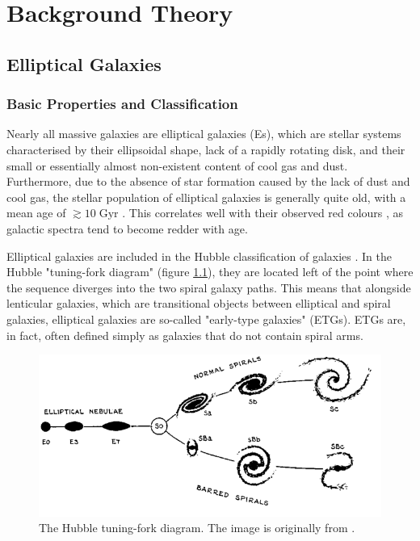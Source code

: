 \documentclass[english, twoside]{HYgradu}
\begin{document}
\chapter{Background Theory} \label{chapter:2}

\section{Elliptical Galaxies} \label{section:elliptical}

\subsection{Basic Properties and Classification}

Nearly all massive galaxies are elliptical galaxies (Es), which are stellar systems characterised by their ellipsoidal shape, lack of a rapidly rotating disk, and their small or essentially almost non-existent content of cool gas and dust. Furthermore, due to the absence of star formation caused by the lack of dust and cool gas, the stellar population of elliptical galaxies is generally quite old, with a mean age of $\gtrsim{10} \; \mathrm{Gyr}$ \citep{GalaxyFormationAndEvo2010}. This correlates well with their observed red colours \citep{Cappellari2016}, as galactic spectra tend to become redder with age.

Elliptical galaxies are included in the Hubble classification of galaxies \citep{Hubble1926}. In the Hubble "tuning-fork diagram" (figure \ref{figure:tuning_fork}), they are located left of the point where the sequence diverges into the two spiral galaxy paths. This means that alongside lenticular galaxies, which are transitional objects between elliptical and spiral galaxies, elliptical galaxies are so-called "early-type galaxies" (ETGs). ETGs are, in fact, often defined simply as galaxies that do not contain spiral arms.

\begin{figure}
	\centering
	\includegraphics[width=\textwidth]{TuningForkHubble.png}
	\caption{The Hubble tuning-fork diagram. The image is originally from \cite{Hubble1936}.}
	\label{figure:tuning_fork}
\end{figure}
\end{document}
